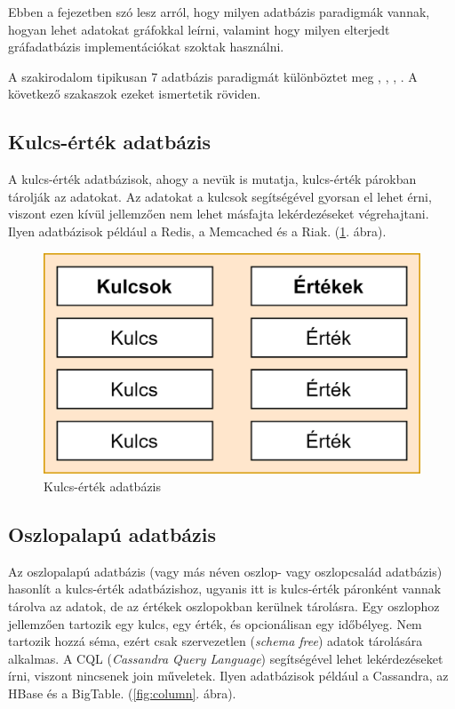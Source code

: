 
Ebben a fejezetben szó lesz arról, hogy milyen adatbázis paradigmák vannak, hogyan lehet adatokat gráfokkal leírni, valamint hogy milyen elterjedt gráfadatbázis implementációkat szoktak használni.


A szakirodalom tipikusan 7 adatbázis paradigmát különböztet meg \cite{paradigms}, \cite{nosql1}, \cite{nosql2}, \cite{nosql3}.
A következő szakaszok ezeket ismertetik röviden.

\subsection{Kulcs-érték adatbázis}

A kulcs-érték adatbázisok, ahogy a nevük is mutatja,  kulcs-érték párokban tárolják az adatokat. Az adatokat a kulcsok segítségével gyorsan el lehet érni, viszont ezen kívül jellemzően nem lehet másfajta lekérdezéseket végrehajtani. Ilyen adatbázisok például a Redis, a Memcached és a Riak. (\ref{fig:keyvalue}. ábra).

\begin{figure}[h]
    \centering
    \includegraphics[scale=1]{images/paradigms/key-value.png}
    \caption{Kulcs-érték adatbázis}
    \label{fig:keyvalue}
\end{figure}

\subsection{Oszlopalapú adatbázis}

Az oszlopalapú adatbázis (vagy más néven oszlop- vagy oszlopcsalád adatbázis) hasonlít a kulcs-érték adatbázishoz, ugyanis itt is kulcs-érték páronként vannak tárolva az adatok, de az értékek oszlopokban kerülnek tárolásra. Egy oszlophoz jellemzően tartozik egy kulcs, egy érték, és opcionálisan egy időbélyeg. Nem tartozik hozzá séma, ezért csak szervezetlen (\textit{schema free}) adatok tárolására alkalmas. A CQL (\textit{Cassandra Query Language}) segítségével lehet lekérdezéseket írni, viszont nincsenek join műveletek. Ilyen adatbázisok például a Cassandra, az HBase és a BigTable. (\ref{fig:column}. ábra).

